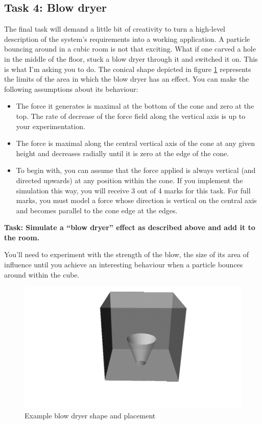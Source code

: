 \documentclass[12pt]{article}
\begin{document}
\subsection*{Task 4: Blow dryer}

The final task will demand a little bit of creativity to turn a high-level description of the system's requirements into a working application. A particle bouncing around in a cubic room is not that exciting. What if one carved a hole in the middle of the floor, stuck a blow dryer through it and switched it on. This is what I'm asking you to do. The conical shape depicted in figure \ref{fig:blowdryer} represents the limits of the area in which the blow dryer has an effect. You can make the following assumptions about its behaviour:

\begin{itemize}
\item The force it generates is maximal at the bottom of the cone and zero at the top. The rate of decrease of the force field along the vertical axis is up to your experimentation. 
\item The force is maximal along the central vertical axis of the cone at any given height and decreases radially until it is zero at the edge of the cone. 
\item To begin with, you can assume that the force applied is always vertical (and directed upwards) at any position within the cone. If you implement the simulation this way, you will receive 3 out of 4 marks for this task. For full marks, you must model a force whose direction is vertical on the central axis and becomes parallel to the cone edge at the edges.
\end{itemize}

\textbf{Task: Simulate a ``blow dryer'' effect as described above and add it to the room.}

You'll need to experiment with the strength of the blow, the size of its area of influence until you achieve an interesting behaviour when a particle bounces around within the cube.

\begin{figure}[t]
\begin{center}
\includegraphics[width=\textwidth]{p3-blowdryer.png}
\caption{Example blow dryer shape and placement}
\label{fig:blowdryer}
\end{center}
\end{figure}
\end{document}
